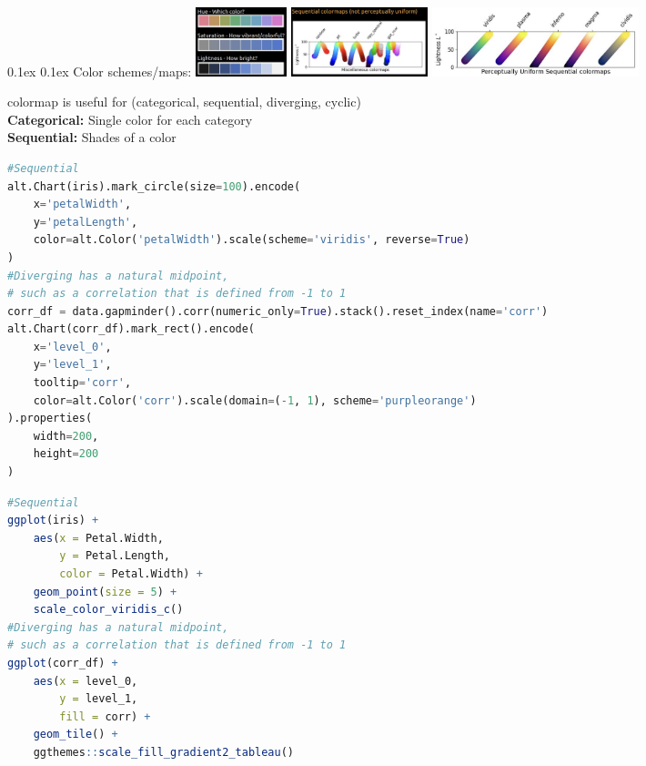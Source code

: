 \documentclass[8pt,landscape]{article}
\makeatletter
\renewcommand{\subsection}{\@startsection{subsection}{2}{0pt}%
    {0.1ex}%
    {0.1ex}%
    {\fontsize{8}{9}\bfseries\color{blue}}} %
\newcommand{\smalltext}[1]{%
  {\fontsize{8}{9}\selectfont\sloppy #1\par}%
}
\makeatother
\begin{document}
\begin{multicols}{3}
\subsection{Color schemes/maps:}
\includegraphics[width=0.5\linewidth, height=2cm]{HSL.png}
\includegraphics[width=0.5\linewidth, height=2cm]{seq-not.png}
\includegraphics[width=0.5\linewidth, height=2cm]{seq.png}
\smalltext{
colormap is useful for (categorical, sequential, diverging, cyclic) \\
\textbf{Categorical:} Single color for each category \\
\textbf{Sequential:} Shades of a color \\
}
\begin{lstlisting}[language=Python]
#Sequential
alt.Chart(iris).mark_circle(size=100).encode(
    x='petalWidth',
    y='petalLength',
    color=alt.Color('petalWidth').scale(scheme='viridis', reverse=True)
)
#Diverging has a natural midpoint, 
# such as a correlation that is defined from -1 to 1
corr_df = data.gapminder().corr(numeric_only=True).stack().reset_index(name='corr')
alt.Chart(corr_df).mark_rect().encode(
    x='level_0',
    y='level_1',
    tooltip='corr',
    color=alt.Color('corr').scale(domain=(-1, 1), scheme='purpleorange')
).properties(
    width=200,
    height=200
)
\end{lstlisting}
\begin{lstlisting}[language=R]
#Sequential
ggplot(iris) + 
    aes(x = Petal.Width,
        y = Petal.Length,
        color = Petal.Width) +
    geom_point(size = 5) +
    scale_color_viridis_c()
#Diverging has a natural midpoint, 
# such as a correlation that is defined from -1 to 1
ggplot(corr_df) +
    aes(x = level_0,
        y = level_1,
        fill = corr) +
    geom_tile() +
    ggthemes::scale_fill_gradient2_tableau()
\end{lstlisting}


\end{multicols}
\end{document}
